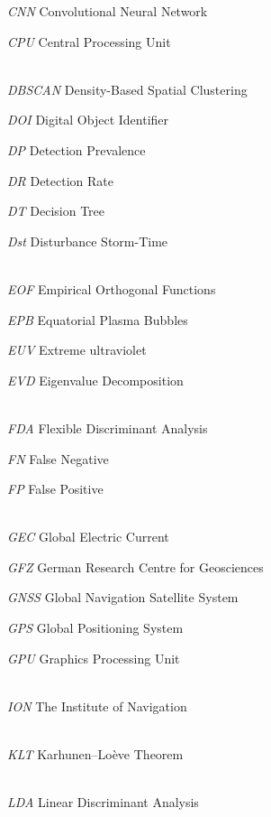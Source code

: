 \let\LaTeXcline\cline\documentclass[sn-mathphys-num]{sn-jnl}\let\cline\LaTeXcline
\begin{document}
\textit{CNN} Convolutional Neural Network

\textit{CPU} Central Processing Unit


\\[2\baselineskip]

\textit{DBSCAN} Density-Based Spatial Clustering

\textit{DOI} Digital Object Identifier

\textit{DP} Detection Prevalence

\textit{DR} Detection Rate

\textit{DT} Decision Tree

\textit{Dst} Disturbance Storm-Time


\\[2\baselineskip]

\textit{EOF} Empirical Orthogonal Functions

\textit{EPB} Equatorial Plasma Bubbles

\textit{EUV} Extreme ultraviolet

\textit{EVD} Eigenvalue Decomposition


\\[2\baselineskip]

\textit{FDA} Flexible Discriminant Analysis

\textit{FN} False Negative

\textit{FP} False Positive


\\[2\baselineskip]

\textit{GEC} Global Electric Current

\textit{GFZ} German Research Centre for Geosciences

\textit{GNSS} Global Navigation Satellite System

\textit{GPS} Global Positioning System

\textit{GPU} Graphics Processing Unit


\\[2\baselineskip]

\textit{ION} The Institute of Navigation


\\[2\baselineskip]

\textit{KLT} Karhunen–Loève Theorem


\\[2\baselineskip]

\textit{LDA} Linear Discriminant Analysis


\\[2\baselineskip]
\end{document}
